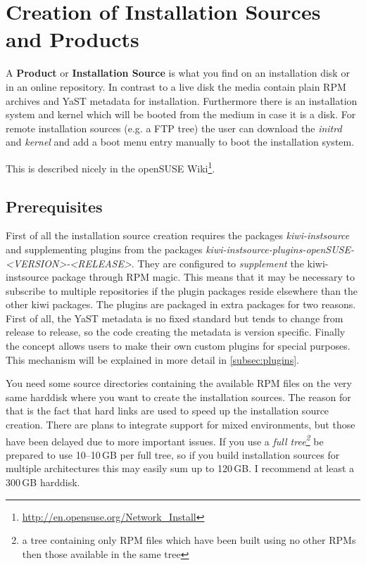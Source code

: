\chapter{Creation of Installation Sources and Products}
\label{chapter:instsrc}
\minitoc


A \textbf{Product} or \textbf{Installation Source} is what you find on an
installation disk or in an online repository. In contrast to a live disk the
media contain plain RPM archives and YaST metadata for installation. Furthermore
there is an installation system and kernel which will be booted from the medium
in case it is a disk. For remote installation sources (e.g. a FTP tree) the user
can download the \textit{initrd} and \textit{kernel} and add a boot menu entry
manually to boot the installation system.

This is described nicely in the openSUSE Wiki\footnote{
\href{http://en.opensuse.org/Network\_Install}{http://en.opensuse.org/Network\_Install}}.


\section{Prerequisites}
\label{sec:prereq}

First of all the installation source creation requires the packages
\textit{kiwi-instsource} and supplementing plugins from the packages
\textit{kiwi-inst\-source-plugins-open\-SU\-SE-<VERSION>-<RELEASE>}.
They are configured to \textit{supplement} the kiwi-inst\-source
package through RPM magic. This means that it may be necessary to subscribe to
multiple repositories if the plugin packages reside elsewhere than the other
kiwi packages. The plugins are packaged in extra packages for two reasons.
First of all, the YaST metadata is no fixed standard but tends to change from
release to release, so the code creating the metadata is version specific.
Finally the concept allows users to make their own
custom plugins for special purposes. This mechanism will be explained in more
detail in \vref{subsec:plugins}.

You need some source directories containing the available RPM files on the very
same harddisk where you want to create the installation sources. The reason for
that is the fact that hard links are used to speed up the installation source
creation. There are plans to integrate support for mixed environments, but those
have been delayed due to more important issues. If you use a \textit{full
tree\footnote{a tree containing only RPM files which have been built using no
other RPMs then those available in the same tree}} be prepared to use 10--10\,GB
per full tree, so if you build installation sources for multiple architectures
this may easily sum up to 120\,GB. I recommend at least a 300\,GB harddisk.

